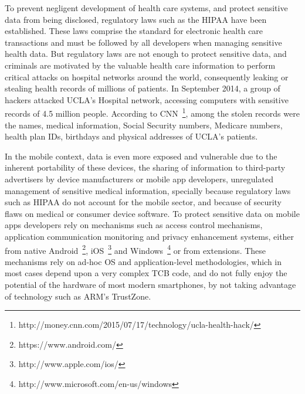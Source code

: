 To prevent negligent development of health care systems, and protect sensitive data from being disclosed, regulatory laws such as the \ac{HIPAA} have been established. These laws comprise the standard for electronic health care transactions and must be followed by all developers when managing sensitive health data. But regulatory laws are not enough to protect sensitive data, and criminals are motivated by the valuable health care information to perform critical attacks on hospital networks around the world, consequently leaking or stealing health records of millions of patients. In September 2014, a group of hackers attacked UCLA's Hospital network, accessing computers with sensitive records of 4.5 million people. According to \ac{CNN}~\footnote{http://money.cnn.com/2015/07/17/technology/ucla-health-hack/}, among the stolen records were the names, medical information, Social Security numbers, Medicare numbers, health plan IDs, birthdays and physical addresses of UCLA's patients.

In the mobile context, data is even more exposed and vulnerable due to the inherent portability of these devices, the sharing of information to third-party advertisers by device manufacturers or mobile app developers, unregulated management of sensitive medical information, specially because regulatory laws such as \ac{HIPAA} do not account for the mobile sector, and because of security flaws on medical or consumer device software.
To protect sensitive data on mobile apps developers rely on mechanisms such as access control mechanisms, application communication monitoring and privacy enhancement systems, either from native Android~\footnote{https://www.android.com/}, iOS~\footnote{http://www.apple.com/ios/} and Windows~\footnote{http://www.microsoft.com/en-us/windows} or from extensions. These mechanisms rely on ad-hoc \ac{OS} and application-level methodologies, which in most cases depend upon a very complex \ac{TCB} code, and do not fully enjoy the potential of the hardware of most modern smartphones, by not taking advantage of technology such as ARM's TrustZone.\\


